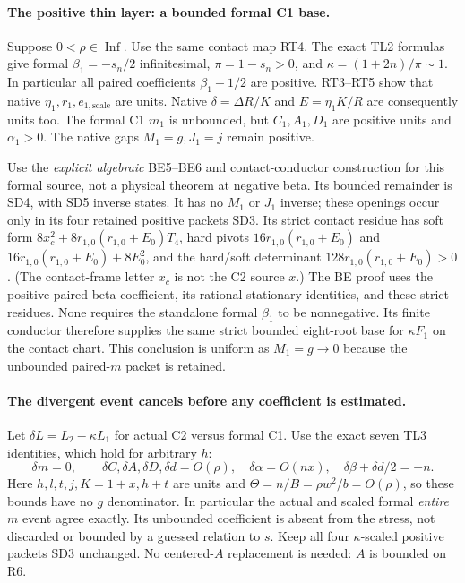 \paragraph{The positive thin layer: a bounded formal C1 base.}
Suppose $0<\rho\in\operatorname{Inf}$. Use the same contact map RT4.
The exact TL2 formulas give formal $\beta_1=-s_n/2$ infinitesimal,
$\pi=1-s_n>0$, and $\kappa=(1+2n)/\pi\sim1$. In particular all
paired coefficients $\beta_1+1/2$ are positive. RT3--RT5 show that
native $\eta_1,r_1,e_{1,\mathrm{scale}}$ are units. Native
$\delta=\Delta R/K$ and $E=\eta_1K/R$ are consequently units too.
The formal C1 $m_1$ is unbounded, but $C_1,A_1,D_1$ are positive units
and $\alpha_1>0$. The native gaps $M_1=g,J_1=j$ remain positive.

Use the \emph{explicit algebraic} BE5--BE6 and contact-conductor
construction for this formal source, not a physical theorem at
negative beta. Its bounded remainder is SD4, with SD5 inverse states.
It has no $M_1$ or $J_1$ inverse; these openings occur only in its
four retained positive packets SD3. Its strict contact residue has
soft form $8x_c^2+8r_{1,0}(r_{1,0}+E_0)T_4$, hard pivots
$16r_{1,0}(r_{1,0}+E_0)$ and
$16r_{1,0}(r_{1,0}+E_0)+8E_0^2$, and the hard/soft determinant
$128r_{1,0}(r_{1,0}+E_0)>0$.
(The contact-frame letter $x_c$ is not the C2 source $x$.)
The BE proof uses the positive paired beta coefficient, its rational
stationary identities, and these strict residues. None requires the
standalone formal $\beta_1$ to be nonnegative. Its finite conductor
therefore supplies the same strict bounded eight-root base for
$\kappa F_1$ on the contact chart. This conclusion is uniform as
$M_1=g\to0$ because the unbounded paired-$m$ packet is retained.

\paragraph{The divergent event cancels before any coefficient is estimated.}
Let $\delta L=L_2-\kappa L_1$ for actual C2 versus formal C1.
Use the exact seven TL3 identities, which hold for arbitrary $h$:
\[
 \delta m=0,\qquad \delta C,\delta A,\delta D,\delta d=O(\rho),
 \quad \delta\alpha=O(nx),\quad
 \delta\beta+\delta d/2=-n.                          \tag{RT6}
\]
Here $h,l,t,j,K=1+x,h+t$ are units and
$\Theta=n/B=\rho w^2/b=O(\rho)$, so these bounds have no $g$
denominator. In particular the actual and scaled formal \emph{entire}
$m$ event agree exactly. Its unbounded coefficient is absent from the
stress, not discarded or bounded by a guessed relation to $s$.
Keep all four $\kappa$-scaled positive packets SD3 unchanged.
No centered-$A$ replacement is needed: $A$ is bounded on R6.

